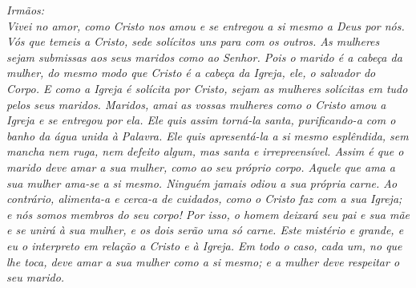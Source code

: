 \documentclass[a5paper,9pt]{memoir}
\begin{document}
{\begin{paracol}{2}
	\itshape
	Irmãos:\\
	Vivei no amor, como Cristo nos amou e se entregou a si mesmo a Deus por n\'os. V\'os que temeis a Cristo, sede sol\'icitos uns para com os outros. As mulheres sejam submissas aos seus maridos como ao Senhor. Pois o marido \'e a cabe\c ca da mulher, do mesmo modo que Cristo \'e a cabe\c ca da Igreja, ele, o salvador do Corpo. E como a Igreja \'e sol\'icita por Cristo, sejam as mulheres sol\'icitas em tudo pelos seus maridos. Maridos, amai as vossas mulheres como o Cristo amou a Igreja e se entregou por ela. Ele quis assim torn\'a-la santa, purificando-a com o banho da \'agua unida \`a Palavra. Ele quis apresent\'a-la a si mesmo espl\^endida, sem mancha nem ruga, nem defeito algum, mas santa e irrepreens\'ivel. Assim \'e que o marido deve amar a sua mulher, como ao seu pr\'oprio corpo. Aquele que ama a sua mulher ama-se a si mesmo. Ningu\'em jamais odiou a sua pr\'opria carne. Ao contr\'ario, alimenta-a e cerca-a de cuidados, como o Cristo faz com a sua Igreja; e n\'os somos membros do seu corpo! Por isso, o homem deixar\'a seu pai e sua m\~ae e se unir\'a \`a sua mulher, e os dois ser\~ao uma s\'o carne. Este mist\'erio e grande, e eu o interpreto em rela\c c\~ao a Cristo e \`a Igreja. Em todo o caso, cada um, no que lhe toca, deve amar a sua mulher como a si mesmo; e a mulher deve respeitar o seu marido.
\end{paracol}

}
\end{document}
